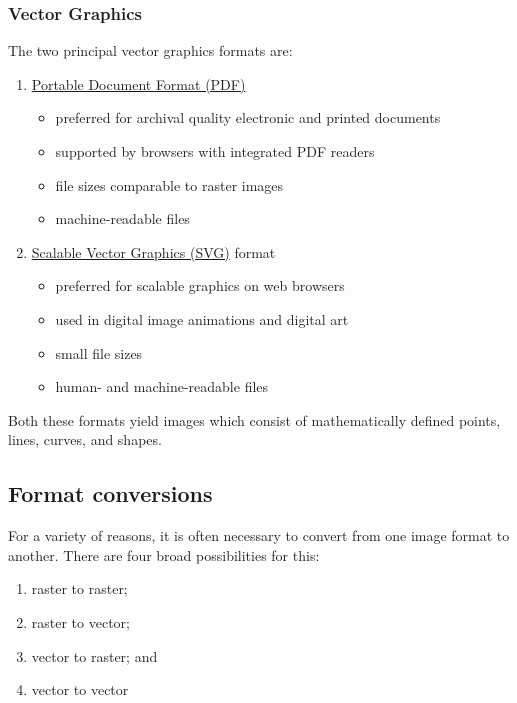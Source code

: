 \documentclass[
  11pt,
  british,
  a4paper,
]{article}
\providecommand{\tightlist}{%
  \setlength{\itemsep}{0pt}\setlength{\parskip}{0pt}}
\begin{document}
\hypertarget{vector-graphics}{%
\subsubsection{Vector Graphics}\label{vector-graphics}}

The two principal vector graphics formats are:

\begin{enumerate}
\tightlist
\item
  \href{https://en.wikipedia.org/wiki/PDF}{Portable Document Format
  (PDF)}

  \begin{itemize}
  \tightlist
  \item
    preferred for archival quality electronic and printed documents
  \item
    supported by browsers with integrated PDF readers
  \item
    file sizes comparable to raster images
  \item
    machine-readable files
  \end{itemize}
\item
  \href{https://en.wikipedia.org/wiki/Scalable_Vector_Graphics}{Scalable
  Vector Graphics (SVG)} format

  \begin{itemize}
  \tightlist
  \item
    preferred for scalable graphics on web browsers
  \item
    used in digital image animations and digital art
  \item
    small file sizes
  \item
    human- and machine-readable files
  \end{itemize}
\end{enumerate}

Both these formats yield images which consist of mathematically defined
points, lines, curves, and shapes.

\hypertarget{format-conversions}{%
\subsection{Format conversions}\label{format-conversions}}

For a variety of reasons, it is often necessary to convert from one
image format to another. There are four broad possibilities for this:

\begin{enumerate}
\def\labelenumi{\alph{enumi}.}
\tightlist
\item
  raster to raster;
\item
  raster to vector;
\item
  vector to raster; and
\item
  vector to vector
\end{enumerate}
\end{document}

